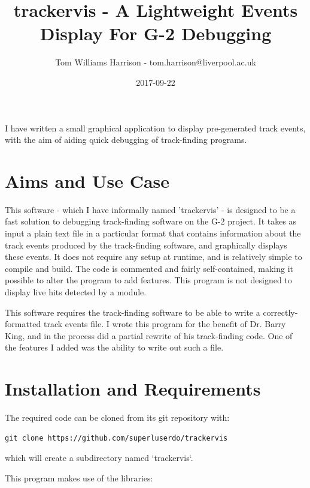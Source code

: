 \documentclass[12pt]{article}
\begin{document}
\title{trackervis - A Lightweight Events Display For G-2 Debugging}
\author{Tom Williams Harrison - tom.harrison@liverpool.ac.uk}
\date{2017-09-22}
\maketitle

I have written a small graphical application to display pre-generated track events, with the aim of aiding quick debugging of track-finding programs.

\section*{Aims and Use Case}

This software - which I have informally named 'trackervis' - is designed to be a fast solution to debugging track-finding software on the G-2 project. It takes as input a plain text file in a particular format that contains information about the track events produced by the track-finding software, and graphically displays these events. It does not require any setup at runtime, and is relatively simple to compile and build. The code is commented and fairly self-contained, making it possible to alter the program to add features. This program is not designed to display live hits detected by a module.\newline

This software requires the track-finding software to be able to write a correctly-formatted track events file. I wrote this program for the benefit of Dr. Barry King, and in the process did a partial rewrite of his track-finding code. One of the features I added was the ability to write out such a file.\newline

\section*{Installation and Requirements}

The required code can be cloned from its git repository with:
\begin{verbatim}
git clone https://github.com/superluserdo/trackervis
\end{verbatim}

which will create a subdirectory named `trackervis`.\newline

This program makes use of the libraries:
\end{document}
